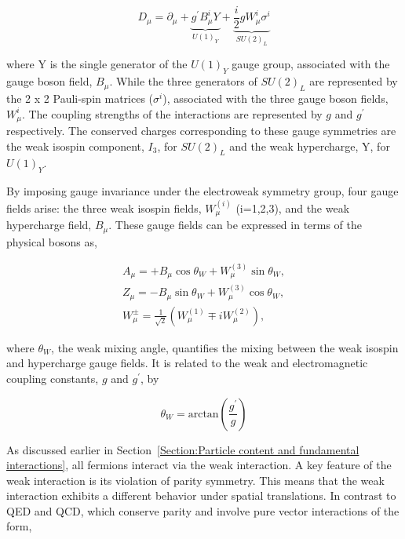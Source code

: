 \begin{equation}
    D_\mu = \partial_\mu + \underbrace{g^{\prime}B^i_\mu Y}_{U(1)_Y} + \underbrace{\frac{i}{2}gW^i_\mu\sigma^i}_{SU(2)_L}
\end{equation}

where Y is the single generator of the $U(1)_Y$ gauge group, associated with the gauge boson field, $B_\mu$. While the three generators of $SU(2)_L$ are represented by the 2 x 2 Pauli-spin matrices ($\sigma^i$), associated with the three gauge boson fields, $W^i_\mu$. The coupling strengths of the interactions are represented by $g$ and $g^{\prime}$ respectively. The conserved charges corresponding to these gauge symmetries are the weak isospin component, $I_3$, for $SU(2)_L$ and the weak hypercharge, Y, for $U(1)_Y$.

By imposing gauge invariance under the electroweak symmetry group, four gauge fields arise: the three weak isospin fields, $W_{\mu}^{(i)}$ (i=1,2,3), and the weak hypercharge field, $B_{\mu}$. These gauge fields can be expressed in terms of the physical bosons as,

\begin{equation}
\begin{array}{c}
A_{\mu} = + B_{\mu} \cos{\theta_{W}} + W_{\mu}^{(3)} \sin{\theta_{W}}, \\
Z_{\mu} = - B_{\mu} \sin{\theta_{W}} + W_{\mu}^{(3)} \cos{\theta_{W}}, \\
W_{\mu}^{\pm} = \frac{1}{\sqrt{2}} (W_{\mu}^{(1)} \mp iW_{\mu}^{(2)}),
\end{array}
\label{Equation:Introduction_PhysicalGaugeFields}
\end{equation}

where $\theta_{W}$, the weak mixing angle, quantifies the mixing between the weak isospin and hypercharge gauge fields. It is related to the weak and electromagnetic coupling constants, $g$ and $g^{\prime}$, by

\begin{equation}
    \theta_W = \text{arctan}(\frac{g^{\prime}}{g})
\end{equation}

As discussed earlier in Section~\ref{Section:Particle content and fundamental interactions}, all fermions interact via the weak interaction. A key feature of the weak interaction is its violation of parity symmetry. This means that the weak interaction exhibits a different behavior under spatial translations. In contrast to QED and QCD, which conserve parity and involve pure vector interactions of the form,

